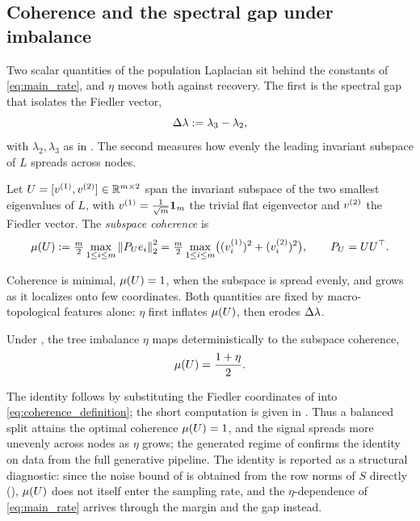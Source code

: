 \subsection{Coherence and the spectral gap under imbalance}\label{sec:bridging-scaling}

Two scalar quantities of the population Laplacian sit behind the constants of
\eqref{eq:main_rate}, and $\eta$ moves both against recovery. The first is the
spectral gap that isolates the Fiedler vector,
\begin{equation}\label{eq:gap_definition}
   \Delta\lambda := \lambda_3 - \lambda_2 ,
\end{equation}
with $\lambda_2,\lambda_3$ as in . The second measures how evenly
the leading invariant subspace of $L$ spreads across nodes.

\begin{definition}\label{def:coherence}
Let $U=[v^{(1)},v^{(2)}]\in\mathbb{R}^{m\times2}$ span the invariant subspace of the two
smallest eigenvalues of $L$, with $v^{(1)}=\tfrac1{\sqrt m}\mathbf{1}_m$ the trivial flat
eigenvector and $v^{(2)}$ the Fiedler vector. The \emph{subspace coherence} is
\begin{equation}\label{eq:coherence_definition}
   \mu(U) := \tfrac{m}{2}\max_{1\le i\le m}\left\lVert P_U e_i \right\rVert_2^2
         = \tfrac{m}{2}\max_{1\le i\le m}\bigl((v_i^{(1)})^2+(v^{(2)}_i)^2\bigr),
   \qquad P_U=UU^\top.
\end{equation}
\end{definition}

\noindent Coherence is minimal, $\mu(U)=1$, when the subspace is spread evenly, and
grows as it localizes onto few coordinates. Both quantities are fixed by
 macro-topological features alone: $\eta$ first inflates $\mu(U)$, then erodes $\Delta\lambda$.

\begin{proposition}\label{prop:coherence}
Under , the tree imbalance $\eta$ maps deterministically to the
subspace coherence,
\begin{equation}\label{eq:coherence_linear_growth}
   \mu(U)=\frac{1+\eta}{2}.
\end{equation}
\end{proposition}
\noindent The identity follows by substituting the Fiedler coordinates of
 into \eqref{eq:coherence_definition}; the short computation is given in
. Thus a balanced split attains the
optimal coherence $\mu(U)=1$, and the signal spreads more unevenly across nodes as
$\eta$ grows; the generated regime of  confirms the identity
on data from the full generative pipeline. The identity is reported as a
structural diagnostic: since the noise bound of  is obtained
from the row norms of $S$ directly (), $\mu(U)$ does not itself enter
the sampling rate, and the $\eta$-dependence of \eqref{eq:main_rate} arrives
through the margin and the gap instead.



